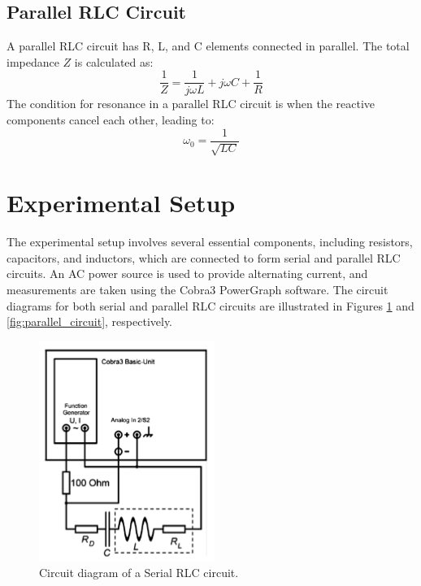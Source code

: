 \documentclass[journal]{IEEEtran}
\begin{document}
\subsection{Parallel RLC Circuit}
A parallel RLC circuit has R, L, and C elements connected in parallel. The total impedance $Z$ is calculated as:
\begin{equation}
    \frac{1}{Z} = \frac{1}{j\omega L} + j\omega C + \frac{1}{R}
\end{equation}
The condition for resonance in a parallel RLC circuit is when the reactive components cancel each other, leading to:
\begin{equation}
    \omega_0 = \frac{1}{\sqrt{LC}}
\end{equation}

\section{Experimental Setup}
The experimental setup involves several essential components, including resistors, capacitors, and inductors, which are connected to form serial and parallel RLC circuits. An AC power source is used to provide alternating current, and measurements are taken using the Cobra3 PowerGraph software. The circuit diagrams for both serial and parallel RLC circuits are illustrated in Figures \ref{fig:serial_circuit} and \ref{fig:parallel_circuit}, respectively. 

\begin{figure}[H]
    \centering
    \includegraphics[width=0.5\linewidth]{IMAGES/series_diagram.png}
    \caption{Circuit diagram of a Serial RLC circuit.}
    \label{fig:serial_circuit}
\end{figure}
\end{document}

